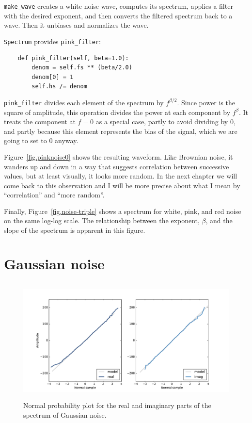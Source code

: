 \documentclass[12pt]{book}
\begin{document}
\verb"make_wave" creates a white noise wave, computes its spectrum,
applies a filter with the desired exponent, and then converts the
filtered spectrum back to a wave.  Then it unbiases and normalizes
the wave.

{\tt Spectrum} provides \verb"pink_filter":

\begin{verbatim}
    def pink_filter(self, beta=1.0):
        denom = self.fs ** (beta/2.0)
        denom[0] = 1
        self.hs /= denom
\end{verbatim}

\verb"pink_filter" divides each element of the spectrum by
$f^{\beta/2}$.  Since power is the square of amplitude, this
operation divides the power at
each component by $f^\beta$.  It treats the component
at $f=0$ as a special case, partly to avoid dividing by 0, and partly
because this element represents the bias of the signal,
which we are going to set to 0 anyway.

Figure~\ref{fig.pinknoise0} shows the resulting waveform.  Like
Brownian noise, it wanders up and down in a way that suggests
correlation between successive values, but at least visually, it looks
more random.  In the next chapter we will come back to this
observation and I will be more precise about what I mean by
``correlation'' and ``more random''.

Finally, Figure~\ref{fig.noise-triple} shows a spectrum for
white, pink, and red noise on the same log-log scale.
The relationship between the exponent, $\beta$, and the slope
of the spectrum is apparent in this figure.


\section{Gaussian noise}

\begin{figure}
\centerline{\includegraphics[height=2.5in]{figs/noise1.pdf}}
\caption{Normal probability plot for the real and imaginary parts
of the spectrum of Gaussian noise.}
\label{fig.noise1}
\end{figure}
\end{document}
